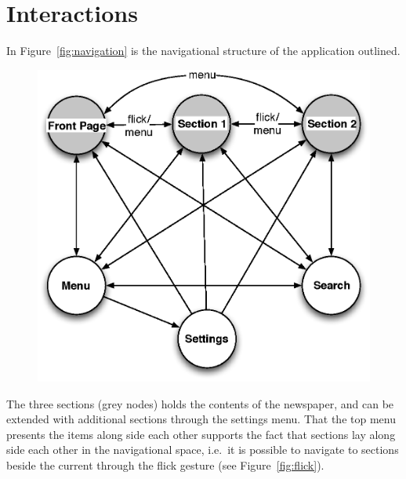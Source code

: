 \section{Interactions}%
In Figure~\ref{fig:navigation} is the navigational structure of the application outlined. 
\begin{figure}[h!tp]
	\myfloatalign
		\includegraphics[width=.7\textwidth]{img/navigation}
\end{figure}
The three sections (grey nodes) holds the contents of the newspaper, and can be extended with additional sections through the settings menu. That the top menu presents the items along side each other supports the fact that sections lay along side each other in the navigational space, i.e.\ it is possible to navigate to sections beside the current through the flick gesture (see Figure~\ref{fig:flick}).
